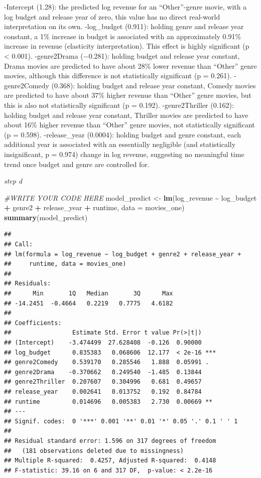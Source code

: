 \documentclass[
]{article}
\newenvironment{Shaded}{\begin{snugshade}}{\end{snugshade}}
\newcommand{\AttributeTok}[1]{\textcolor[rgb]{0.13,0.29,0.53}{#1}}
\newcommand{\CommentTok}[1]{\textcolor[rgb]{0.56,0.35,0.01}{\textit{#1}}}
\newcommand{\FunctionTok}[1]{\textcolor[rgb]{0.13,0.29,0.53}{\textbf{#1}}}
\newcommand{\NormalTok}[1]{#1}
\newcommand{\OtherTok}[1]{\textcolor[rgb]{0.56,0.35,0.01}{#1}}
\newcommand{\SpecialCharTok}[1]{\textcolor[rgb]{0.81,0.36,0.00}{\textbf{#1}}}
\begin{document}
-Intercept (1.28): the predicted log revenue for an ``Other''-genre
movie, with a log budget and release year of zero, this value has no
direct real-world interpretation on its own. -log\_budget (0.911):
holding genre and release year constant, a 1\% increase in budget is
associated with an approximately 0.91\% increase in revenue (elasticity
interpretation). This effect is highly significant (p \textless{}
0.001). -genre2Drama (−0.281): holding budget and release year constant,
Drama movies are predicted to have about 28\% lower revenue than
``Other'' genre movies, although this difference is not statistically
significant (p = 0.261). -genre2Comedy (0.368): holding budget and
release year constant, Comedy movies are predicted to have about 37\%
higher revenue than ``Other'' genre movies, but this is also not
statistically significant (p = 0.192). -genre2Thriller (0.162): holding
budget and release year constant, Thriller movies are predicted to have
about 16\% higher revenue than ``Other'' genre movies, not statistically
significant (p = 0.598). -release\_year (0.0004): holding budget and
genre constant, each additional year is associated with an essentially
negligible (and statistically insignificant, p = 0.974) change in log
revenue, suggesting no meaningful time trend once budget and genre are
controlled for.

\emph{step d}

\begin{Shaded}
\begin{Highlighting}[]
\CommentTok{\#WRITE YOUR CODE HERE}
\NormalTok{model\_predict }\OtherTok{\textless{}{-}} \FunctionTok{lm}\NormalTok{(log\_revenue }\SpecialCharTok{\textasciitilde{}}\NormalTok{ log\_budget }\SpecialCharTok{+}\NormalTok{ genre2 }\SpecialCharTok{+}\NormalTok{ release\_year }\SpecialCharTok{+}\NormalTok{ runtime, }\AttributeTok{data =}\NormalTok{ movies\_one)}
\FunctionTok{summary}\NormalTok{(model\_predict)}
\end{Highlighting}
\end{Shaded}

\begin{verbatim}
## 
## Call:
## lm(formula = log_revenue ~ log_budget + genre2 + release_year + 
##     runtime, data = movies_one)
## 
## Residuals:
##      Min       1Q   Median       3Q      Max 
## -14.2451  -0.4664   0.2219   0.7775   4.6182 
## 
## Coefficients:
##                 Estimate Std. Error t value Pr(>|t|)    
## (Intercept)    -3.474499  27.628408  -0.126  0.90000    
## log_budget      0.835383   0.068606  12.177  < 2e-16 ***
## genre2Comedy    0.539170   0.285546   1.888  0.05991 .  
## genre2Drama    -0.370662   0.249540  -1.485  0.13844    
## genre2Thriller  0.207607   0.304996   0.681  0.49657    
## release_year    0.002641   0.013752   0.192  0.84784    
## runtime         0.014696   0.005383   2.730  0.00669 ** 
## ---
## Signif. codes:  0 '***' 0.001 '**' 0.01 '*' 0.05 '.' 0.1 ' ' 1
## 
## Residual standard error: 1.596 on 317 degrees of freedom
##   (181 observations deleted due to missingness)
## Multiple R-squared:  0.4257, Adjusted R-squared:  0.4148 
## F-statistic: 39.16 on 6 and 317 DF,  p-value: < 2.2e-16
\end{verbatim}
\end{document}
